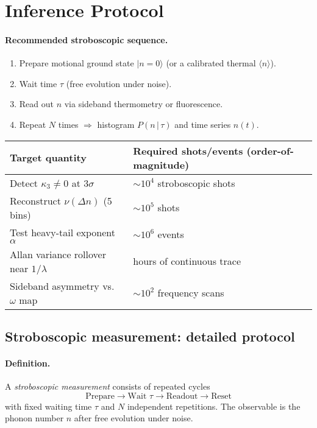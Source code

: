 \section{Inference Protocol}
\label{sec:inference-protocol}
\label{sec:inference_protocol}
\paragraph{Recommended stroboscopic sequence.}
\begin{enumerate}\itemsep0.2em
  \item Prepare motional ground state $\lvert n=0\rangle$ (or a calibrated thermal $\langle n\rangle$).
  \item Wait time $\tau$ (free evolution under noise).
  \item Read out $n$ via sideband thermometry or fluorescence.
  \item Repeat $N$ times $\Rightarrow$ histogram $P(n\,|\,\tau)$ and time series $n(t)$.
\end{enumerate}

\begin{table}[h]
  \centering
  \renewcommand{\arraystretch}{1.15}
  \begin{tabularx}{0.9\textwidth}{>{\raggedright\arraybackslash}X>{\raggedleft\arraybackslash}p{4.2cm}}
    \hline
    \textbf{Target quantity} & \textbf{Required shots/events (order-of-magnitude)} \\
    \hline
    Detect $\kappa_3 \neq 0$ at $3\sigma$ & $\sim 10^4$ stroboscopic shots \\
    Reconstruct $\nu(\Delta n)$ (5 bins)  & $\sim 10^5$ shots \\
    Test heavy-tail exponent $\alpha$      & $\sim 10^6$ events \\
    Allan variance rollover near $1/\lambda$ & hours of continuous trace \\
    Sideband asymmetry vs.\ $\omega$ map   & $\sim 10^2$ frequency scans \\
    \hline
  \end{tabularx}
\end{table}

\subsection{Stroboscopic measurement: detailed protocol}
\paragraph{Definition.}
A \emph{stroboscopic measurement} consists of repeated cycles
\[
  \text{Prepare} \to \text{Wait } \tau \to \text{Readout} \to \text{Reset}
\]
with fixed waiting time $\tau$ and $N$ independent repetitions.
The observable is the phonon number $n$ after free evolution under noise.

